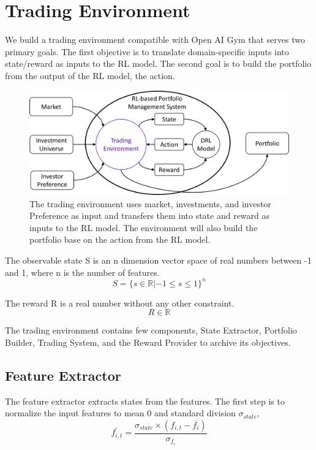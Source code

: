 \chapter{Trading Environment}
\label{c:trading_environment}
We build a trading environment compatible with Open AI Gym \cite{brockman2016openai} that serves two primary goals. The first objective is to translate domain-specific inputs into state/reward as inputs to the RL model. The second goal is to build the portfolio from the output of the RL model, the action.
\begin{figure}[ht]
  \includegraphics[width=15cm]{images/trading_environment.png}
  \caption[Trading Environment] { The trading environment uses market, investments, and investor Preference as input and transfers them into state and reward as inputs to the RL model. The environment will also build the portfolio base on the action from the RL model.}
  \label{fig:trading_environment} 
\end{figure}
\par
The observable state S is an n dimension vector space of real numbers between -1 and 1, where n is the number of features.
\[
    S = \{ {s \in \mathbb{R} | -1 \leq s \leq 1 } \} ^n
\]

\par
The reward R is a real number without any other constraint.
\[
    R \in \mathbb{R}
\]

\par
The trading environment contains few components, State Extractor, Portfolio Builder, Trading System, and the Reward Provider to archive its objectives.

\section {Feature Extractor}
The feature extractor extracts states from the features. 
The first step is to normalize the input features to mean 0 and standard division \(\sigma_{state}\),
\[
    f^{'}_{i,t} = \frac{\sigma_{state} \times   (f_{i,t} -  \overline{f_i})}{\sigma_{f_i}}
\]

